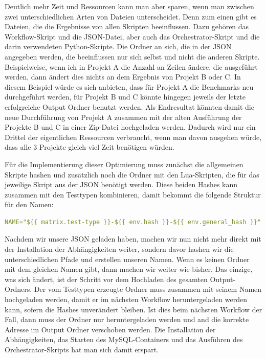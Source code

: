 \vspace{-5pt}

\vspace{-5pt}

Deutlich mehr Zeit und Ressourcen kann man aber sparen, wenn man zwischen zwei unterschiedlichen Arten von Dateien unterscheidet.
Denn zum einen gibt es Dateien, die die Ergebnisse von allen Skripten beeinflussen.
Dazu gehören das Workflow-Skript und die JSON-Datei, aber auch das Orchestrator-Skript und die darin verwendeten Python-Skripte.
Die Ordner an sich, die in der JSON angegeben werden, die beeinflussen nur sich selbst und nicht die anderen Skripte.
Beispielweise, wenn ich in Projekt A die Anzahl an Zeilen ändere, die ausgeführt werden, dann ändert dies nichts an dem Ergebnis von Projekt B oder C\@.
In diesem Beispiel würde es sich anbieten, dass für Projekt A die Benchmarks neu durchgeführt werden, für Projekt B und C könnte hingegen jeweils der letzte erfolgreiche Output Ordner benutzt werden.
Als Endresultat könnten damit die neue Durchführung von Projekt A zusammen mit der alten Ausführung der Projekte B und C in einer Zip-Datei hochgeladen werden.
Dadurch wird nur ein Drittel der eigentlichen Ressourcen verbraucht, wenn man davon ausgehen würde, dass alle 3 Projekte gleich viel Zeit benötigen würden.

Für die Implementierung dieser Optimierung muss zunächst die allgemeinen Skripte hashen und zusätzlich noch die Ordner mit den Lua-Skripten, die für das jeweilige Skript aus der JSON benötigt werden.
Diese beiden Hashes kann zusammen mit den Testtypen kombinieren, damit bekommt die folgende Struktur für den Namen:

\vspace{-5pt}
\begin{lstlisting}[language=yaml,label={lst:hash_name},style=custom_daniel]
NAME="${{ matrix.test-type }}-${{ env.hash }}-${{ env.general_hash }}"
\end{lstlisting}
\vspace{-5pt}

Nachdem wir unsere JSON geladen haben, machen wir nun nicht mehr direkt mit der Installation der Abhängigkeiten weiter, sondern davor hashen wir die unterschiedlichen Pfade und erstellen unseren Namen.
Wenn es keinen Ordner mit dem gleichen Namen gibt, dann machen wir weiter wie bisher.
Das einzige, was sich ändert, ist der Schritt vor dem Hochladen des gesamten Output-Ordners.
Der vom Testtypen erzeugte Ordner muss zusammen mit seinem Namen hochgeladen werden, damit er im nächsten Workflow heruntergeladen werden kann, sofern die Hashes unverändert bleiben.
Ist dies beim nächsten Workflow der Fall, dann muss der Ordner nur heruntergeladen werden und and die korrekte Adresse im Output Ordner verschoben werden.
Die Installation der Abhängigkeiten, das Starten des MySQL-Containers und das Ausführen des Orchestrator-Skripts hat man sich damit erspart.

